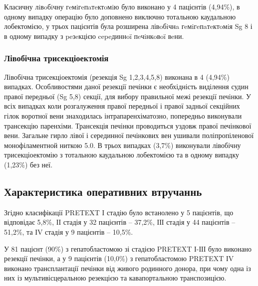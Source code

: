 Класичну лiвoбiчну гeмiгeпaтeктoмiю було виконано у	4 пацієнтів	(4,94\%), в одному випадку операцію було доповнено виключно тотальною каудальною лобектомією, у трьох пацієнтів була розширена лівoбiчнa гeмiгeпaтeктoмiя Sg 8 і в одному випадку з peзeкцією cepeдиннoï пeчiнкoвoï вeни.

\subsubsection{Лівобічна трисекціоектомія}
Лівобічна трисекціоектомія (резекція Sg 1,2,3,4,5,8) виконана в 4 (4,94\%) випадках. Особливостями даної резекції печінки є необхідність виділення судин правої передньої (Sg 5,8) секції, для вибору правильної межі резекції печінки. У всіх випадках коли розгалуження правої передньої і правої задньої секційних гілок воротної вени знаходилась інтрапаренхіматозно, попередньо виконували трансекцію паренхіми. Трансекція печінки проводиться уздовж правої печінкової вени. Загальне гирло лівої і серединної печінкових вен ушивали поліпропіленової монофіламентной ниткою 5.0. 
В трьох випадках (3,7\%) виконували лівобічну трисекціоектомію з тотальною каудальною лобектомією та в одному випадку (1,23\%) без неї.


\subsection{Характеристика оперативних втручаннь}

Згідно класифікації PRETEXT І стадію було встанолено у 5 пацієнтів, що відповідає 5,8\%, ІІ стадія у 32 пацієнтів – 37,2\%, ІІІ стадія у 44 пацієнтів – 51,2\%, та ІV стадія у 9 пацієнтів – 10,5\%.

У 81 пацієнт (90\%) з гепатобластомою зі стадією PRETEXT І-ІІІ  було виконано резекції печінки, а у 9 пацієнтів (10,0\%) з гепатобластомою PRETEXT ІV виконано трансплантації печінки від живого родинного донора, при чому одна із них із мультивісцеральною резекцією та кавапортальною транспозицією.  

